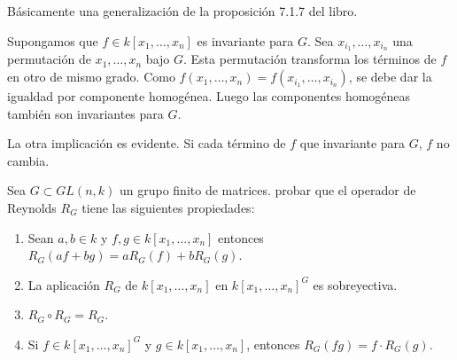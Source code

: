 \documentclass[twoside]{article}
\begin{document}
\begin{solucion}
Básicamente una generalización de la proposición 7.1.7 del libro.

Supongamos que $f \in k[x_1,\dots,x_n]$ es invariante para $G$.
Sea $x_{i_1},\dots,x_{i_n}$ una permutación de $x_1,\dots,x_n$ bajo $G$.
Esta permutación transforma los términos de $f$ en otro de mismo grado.
Como $f(x_1,\dots,x_n) = f(x_{i_1},\dots,x_{i_n})$, se debe dar la igualdad por componente homogénea.
Luego las componentes homogéneas también son invariantes para $G$.

La otra implicación es evidente. Si cada término de $f$ que invariante para $G$, $f$ no cambia.
\end{solucion}

\newpage

\begin{ejercicio}{4}
Sea $G \subset GL(n,k)$ un grupo finito de matrices.
probar que el operador de Reynolds $R_G$ tiene las siguientes propiedades:
\begin{enumerate}
\item Sean $a,b \in k$ y $f, g \in k[x_1,\dots,x_n]$ entonces $R_G(a f + b g) = a R_G(f) + b R_G(g)$.
\item La aplicación $R_G$ de $k[x_1,\dots,x_n]$ en $k[x_1,\dots,x_n]^G$ es sobreyectiva.
\item $R_G \circ R_G = R_G$.
\item Si $f \in k[x_1,\dots,x_n]^G$ y $g \in k[x_1,\dots,x_n]$, entonces $R_G(f g) = f \cdot R_G(g)$.
\end{enumerate}
\end{ejercicio}
\end{document}
